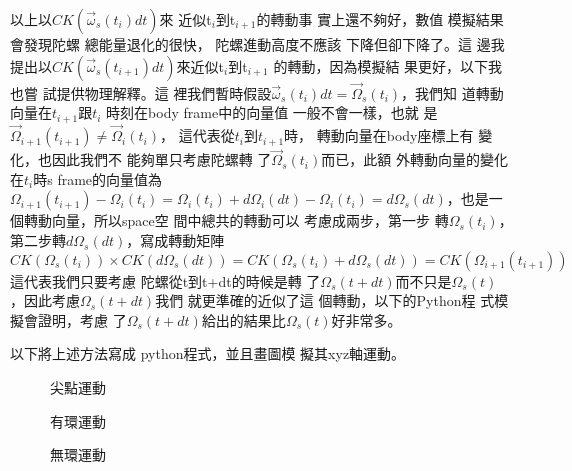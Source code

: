 \documentclass[12pt,a4paper]{article}
\begin{document}
以上以$CK\left( \vec{\omega}_{s}(t_{i})dt\right) $來%
近似t$_{i}$到t$_{i+1}$的轉動事%
實上還不夠好，數值%
模擬結果會發現陀螺%
總能量退化的很快，%
陀螺進動高度不應該%
下降但卻下降了。這%
邊我提出以$CK\left( \vec{\omega}%
_{s}(t_{i+1})dt\right) $來近似t$_{i}$到t$_{i+1}$%
的轉動，因為模擬結%
果更好，以下我也嘗%
試提供物理解釋。這%
裡我們暫時假設$\vec{\omega}%
_{s}(t_{i})dt=\vec{\Omega}_{s}(t_{i})$，我們知%
道轉動向量在$t_{i+1}$跟$t_{i}$%
時刻在body frame中的向量值%
一般不會一樣，也就%
是$\vec{\Omega}_{i+1}(t_{i+1})\neq \vec{\Omega}_{i}(t_{i})$，%
這代表從$t_{i}$到$t_{i+1}$時，%
轉動向量在body座標上有%
變化，也因此我們不%
能夠單只考慮陀螺轉%
了$\vec{\Omega}_{s}(t_{i})$而已，此額%
外轉動向量的變化在$%
t_{i}$時s frame的向量值為$\Omega
_{i+1}(t_{i+1})-\Omega _{i}(t_{i})=\Omega _{i}(t_{i})+d\Omega
_{i}(dt)-\Omega _{i}(t_{i})=d\Omega _{s}(dt)$，也是一%
個轉動向量，所以space空%
間中總共的轉動可以%
考慮成兩步，第一步%
轉$\Omega _{s}(t_{i})$，第二步轉$d\Omega
_{s}(dt)$，寫成轉動矩陣%
\begin{equation}
CK(\Omega _{s}(t_{i}))\times CK(d\Omega _{s}(dt))=CK(\Omega
_{s}(t_{i})+d\Omega _{s}(dt))=CK(\Omega _{i+1}(t_{i+1}))
\end{equation}%
這代表我們只要考慮%
陀螺從t到t+dt的時候是轉%
了$\Omega _{s}(t+dt)$而不只是$\Omega _{s}(t)$%
，因此考慮$\Omega _{s}(t+dt)$我們%
就更準確的近似了這%
個轉動，以下的Python程%
式模擬會證明，考慮%
了$\Omega _{s}(t+dt)$給出的結果比$%
\Omega _{s}(t)$好非常多。

以下將上述方法寫成%
python程式，並且畫圖模%
擬其xyz軸運動。

\begin{figure}[th]
\caption{尖點運動}
\begin{center}
\end{center}
\end{figure}
\bigskip

\begin{figure}[th]
\caption{有環運動}
\begin{center}
\end{center}
\end{figure}

\begin{figure}[th]
\caption{無環運動}
\begin{center}
\end{center}
\end{figure}
\end{document}
